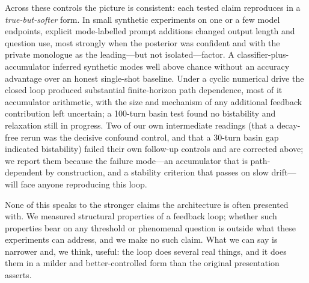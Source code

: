\documentclass[11pt]{article}
\begin{document}
Across these controls the picture is consistent: each tested claim reproduces in
a \emph{true-but-softer} form. In small synthetic experiments on one or a few
model endpoints, explicit mode-labelled prompt additions changed output length
and question use, most strongly when the posterior was confident and with the
private monologue as the leading---but not isolated---factor. A
classifier-plus-accumulator inferred synthetic modes well above chance without
an accuracy advantage over an honest single-shot baseline. Under a cyclic
numerical drive the closed loop produced substantial finite-horizon path
dependence, most of it accumulator arithmetic, with the size and mechanism of
any additional feedback contribution left uncertain; a 100-turn basin test found
no bistability and relaxation still in progress.
Two of our own intermediate readings (that a decay-free rerun was the decisive
confound control, and that a 30-turn basin gap indicated bistability) failed
their own follow-up controls and are corrected above; we report them because the
failure mode---an accumulator that is path-dependent by construction, and a
stability criterion that passes on slow drift---will face anyone reproducing
this loop.

None of this speaks to the stronger claims the architecture is often presented
with. We measured structural properties of a feedback loop; whether such
properties bear on any threshold or phenomenal question is outside what these
experiments can address, and we make no such claim. What we can say is narrower
and, we think, useful: the loop does several real things, and it does them in a
milder and better-controlled form than the original presentation asserts.
\end{document}
